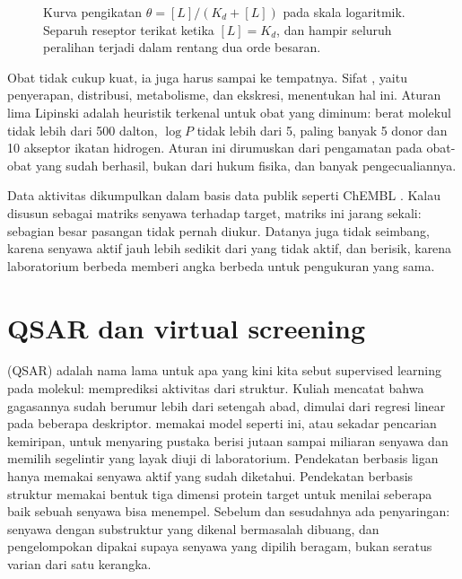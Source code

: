 \begin{figure}[ht]
\centering
{}
\caption{Kurva pengikatan $\theta=[L]/(K_d+[L])$ pada skala logaritmik. Separuh reseptor terikat ketika $[L]=K_d$, dan
hampir seluruh peralihan terjadi dalam rentang dua orde besaran.}
\label{fig:doseresponse}
\end{figure}

Obat tidak cukup kuat, ia juga harus sampai ke tempatnya. Sifat , yaitu penyerapan, distribusi, metabolisme,
dan ekskresi, menentukan hal ini. Aturan lima Lipinski \citep{lipinski1997} adalah heuristik terkenal untuk obat yang
diminum: berat molekul tidak lebih dari 500 dalton, $\log P$ tidak lebih dari 5, paling banyak 5 donor dan 10 akseptor
ikatan hidrogen. Aturan ini dirumuskan dari pengamatan pada obat-obat yang sudah berhasil, bukan dari hukum fisika, dan
banyak pengecualiannya.

Data aktivitas dikumpulkan dalam basis data publik seperti ChEMBL \citep{gaulton2012}. Kalau disusun sebagai matriks
senyawa terhadap target, matriks ini jarang sekali: sebagian besar pasangan tidak pernah diukur. Datanya juga tidak
seimbang, karena senyawa aktif jauh lebih sedikit dari yang tidak aktif, dan berisik, karena laboratorium berbeda memberi
angka berbeda untuk pengukuran yang sama.

\section{QSAR dan virtual screening}

 (QSAR) adalah nama lama untuk apa yang kini kita sebut supervised
learning pada molekul: memprediksi aktivitas dari struktur. Kuliah mencatat bahwa gagasannya sudah berumur lebih dari
setengah abad, dimulai dari regresi linear pada beberapa deskriptor.  memakai model seperti ini,
atau sekadar pencarian kemiripan, untuk menyaring pustaka berisi jutaan sampai miliaran senyawa dan memilih segelintir
yang layak diuji di laboratorium. Pendekatan berbasis ligan hanya memakai senyawa aktif yang sudah diketahui. Pendekatan
berbasis struktur memakai bentuk tiga dimensi protein target untuk menilai seberapa baik sebuah senyawa bisa menempel.
Sebelum dan sesudahnya ada penyaringan: senyawa dengan substruktur yang dikenal bermasalah dibuang, dan pengelompokan
dipakai supaya senyawa yang dipilih beragam, bukan seratus varian dari satu kerangka.

